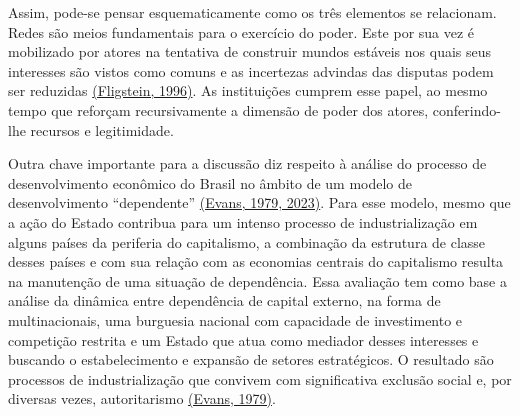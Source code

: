 Assim, pode-se pensar esquematicamente como os três elementos se
relacionam. Redes são meios fundamentais para o exercício do poder. Este
por sua vez é mobilizado por atores na tentativa de construir mundos
estáveis nos quais seus interesses são vistos como comuns e as
incertezas advindas das disputas podem ser reduzidas
\href{https://www.zotero.org/google-docs/?IQxn6o}{(Fligstein, 1996)}. As
instituições cumprem esse papel, ao mesmo tempo que reforçam
recursivamente a dimensão de poder dos atores, conferindo-lhe recursos e
legitimidade.

Outra chave importante para a discussão diz respeito à análise do
processo de desenvolvimento econômico do Brasil no âmbito de um modelo
de desenvolvimento ``dependente''
\href{https://www.zotero.org/google-docs/?uIGiBo}{(Evans, 1979, 2023)}.
Para esse modelo, mesmo que a ação do Estado contribua para um intenso
processo de industrialização em alguns países da periferia do
capitalismo, a combinação da estrutura de classe desses países e com sua
relação com as economias centrais do capitalismo resulta na manutenção
de uma situação de dependência. Essa avaliação tem como base a análise
da dinâmica entre dependência de capital externo, na forma de
multinacionais, uma burguesia nacional com capacidade de investimento e
competição restrita e um Estado que atua como mediador desses interesses
e buscando o estabelecimento e expansão de setores estratégicos. O
resultado são processos de industrialização que convivem com
significativa exclusão social e, por diversas vezes, autoritarismo
\href{https://www.zotero.org/google-docs/?ecY6hE}{(Evans, 1979)}.

